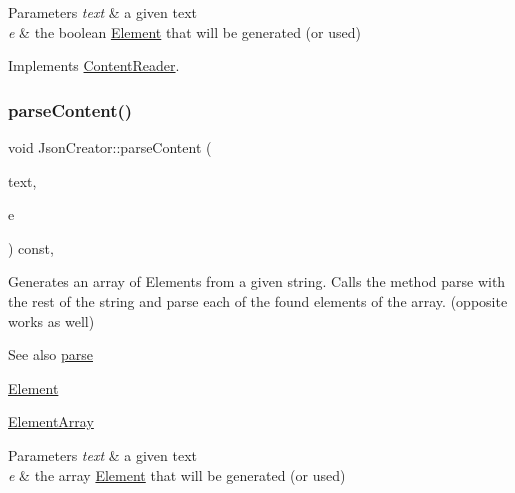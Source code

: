 \begin{DoxyParams}{Parameters}
{\em text} & a given text \\
\hline
{\em e} & the boolean \mbox{\hyperlink{classElement}{Element}} that will be generated (or used) \\
\hline
\end{DoxyParams}


Implements \mbox{\hyperlink{classContentReader_a3ee0aec579c723f17742e10fe7c75e39}{Content\+Reader}}.

\mbox{\label{classJsonCreator_a694669d359eb73890a9e9f247c4ebab4}} 
\subsubsection{\texorpdfstring{parse\+Content()}{parseContent()}\hspace{0.1cm}{\footnotesize\ttfamily [4/6]}}
{\footnotesize\ttfamily void Json\+Creator\+::parse\+Content (\begin{DoxyParamCaption}\item[{std\+::string \&}]{text,  }\item[{\mbox{\hyperlink{classElementArray}{Element\+Array}} $\ast$}]{e }\end{DoxyParamCaption}) const\hspace{0.3cm}{\ttfamily [override]}, {\ttfamily [virtual]}}

Generates an array of Elements from a given string. Calls the method parse with the rest of the string and parse each of the found elements of the array. (opposite works as well) \begin{DoxySeeAlso}{See also}
\mbox{\hyperlink{classJsonCreator_a505ff309c6b144d29478804b0e187c6f}{parse}} 

\mbox{\hyperlink{classElement}{Element}} 

\mbox{\hyperlink{classElementArray}{Element\+Array}}
\end{DoxySeeAlso}

\begin{DoxyParams}{Parameters}
{\em text} & a given text \\
\hline
{\em e} & the array \mbox{\hyperlink{classElement}{Element}} that will be generated (or used) \\
\hline
\end{DoxyParams}


